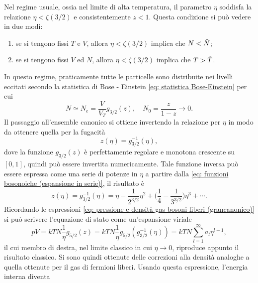 \setcounter{caso}{0}
\begin{caso}
    Nel regime usuale, ossia nel limite di alta temperatura, il parametro $\eta$ soddisfa la relazione $\eta < \zeta(3/2)$ e consistentemente $z < 1$. Questa condizione si può vedere in due modi:
    \begin{enumerate}
        \item se si tengono fissi $T$ e $V$, allora $\eta < \zeta(3/2)$ implica che $N < \hat{N}$;
        \item se si tengono fissi $V$ ed $N$, allora $\eta < \zeta(3/2)$ implica che $T > \hat{T}$.
    \end{enumerate}
    In questo regime, praticamente tutte le particelle sono distribuite nei livelli eccitati secondo la statistica di Bose - Einstein \eqref{eq: statistica Bose-Einstein} per cui
    \begin{equation}
        N \simeq N_e = \frac{V}{V_T}g_{3/2}(z),\quad N_0 = \frac{z}{1 -z} \to 0.
    \end{equation}
    Il passaggio all'ensemble canonico si ottiene invertendo la relazione per $\eta$ in modo da ottenere quella per la fugacità
    \begin{equation}
        z(\eta) = g_{3/2}^{-1}(\eta),
    \end{equation}
    dove la funzione $g_{3/2}(z)$ è perfettamente regolare e monotona crescente su $[0,1]$, quindi può essere invertita numericamente. Tale funzione inversa può essere espressa come una serie di potenze in $\eta$ a partire dalla \eqref{eq: funzioni bosonoiche (espansione in serie)}, il risultato è
    \begin{equation}
        z (\eta)= g_{3/2}^{-1}(\eta) = \eta - \frac{1}{2^{3/2}}\eta^2 + \bigg(\frac{1}{4} - \frac{1}{3^{3/2}}\bigg)\eta^3 + \cdots.
    \end{equation}
    Ricordando le espressioni \eqref{eq: pressione e densità gas bosoni liberi (grancanonico)} si può scrivere l'equazione di stato come un'espansione viriale
    \begin{equation}
        pV = kTN\frac{1}{\eta}g_{5/2}(z) = kTN\frac{1}{\eta}g_{5/2}(g_{3/2}^{-1}(\eta)) = kTN\sum_{l=1}^\infty a_l\eta^{l-1},
    \end{equation}
    il cui membro di destra, nel limite classico in cui $\eta \to 0$, riproduce appunto il risultato classico. Si sono quindi ottenute delle correzioni alla densità analoghe a quella ottenute per il gas di fermioni liberi. Usando questa espressione, l'energia interna diventa
    \begin{equation}

\end{equation}
\end{caso}
